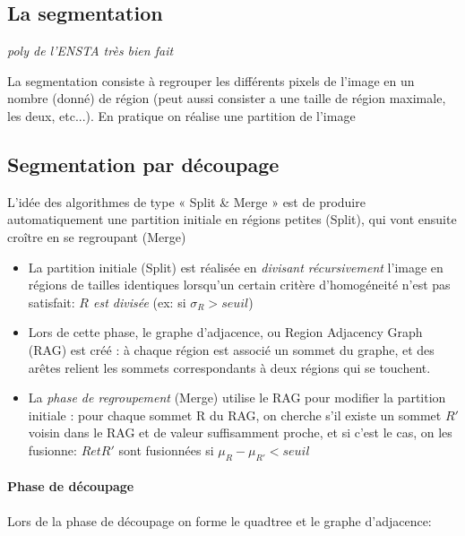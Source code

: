 \documentclass[main.tex]{subfiles}
\begin{document}
\subsection{La segmentation}
\emph{poly de l'ENSTA très bien fait}

La segmentation consiste à regrouper les différents pixels de l'image en un nombre (donné) de région (peut aussi consister a une taille de région maximale, les deux, etc...). En pratique on réalise une partition de l'image

\subsection{Segmentation par découpage}
\begin{defin}
  L'idée des algorithmes de type « Split \& Merge » est de produire
    automatiquement une partition initiale en régions petites (Split), qui vont ensuite croître en se regroupant (Merge)
  \begin{itemize}
  \item  La partition initiale (Split) est  réalisée en \emph{divisant récursivement} l'image en régions de tailles identiques lorsqu'un certain critère d'homogéneité n'est pas satisfait: \emph{$R$ est divisée} (ex: si $\sigma_R> seuil$)

  \item  Lors de cette phase, le graphe d'adjacence, ou Region Adjacency Graph (RAG) est créé :  à chaque région est associé un sommet du graphe, et des arêtes relient les sommets correspondants à deux régions qui se touchent.
  \item La \emph{phase de regroupement} (Merge) utilise le RAG pour modifier la partition initiale : pour chaque sommet R du RAG, on cherche s'il existe un sommet $R'$ voisin dans le RAG et de valeur suffisamment proche, et si c'est le cas, on les fusionne:
 $R et R'$ sont fusionnées si $\mu_{R}-\mu_{R'} < seuil$
\end{itemize}
\end{defin}

\paragraph{Phase de découpage}

Lors de la phase de découpage on forme le quadtree et le graphe d'adjacence:
\end{document}

